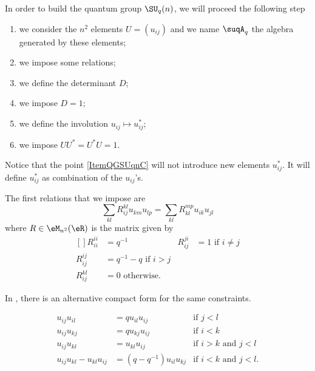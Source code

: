 In order to build the quantum group $\SU_q(n)$, we will proceed the following step\cite{Koelink}
\begin{enumerate}
    \item
        we consider the $n^2$ elements $U=(u_{ij})$ and we name $\suqA_q$ the algebra generated by these elements;
    \item
        we impose some relations;
    \item
        we define the determinant $D$;
    \item
        we impose $D=1$;
    \item\label{ItemQGSUqnC}
        we define the involution $u_{ij}\mapsto u_{ij}^*$;
    \item
        we impose $UU^*=U^*U=1$.
        
\end{enumerate}
Notice that the point \ref{ItemQGSUqnC} will not introduce new elements $u_{ij}^*$. It will define $u_{ij}^*$ as combination of the $u_{ij}$'s.

The first relations that we impose are
\begin{equation}        \label{EqRelsSUqnAvecR}
    \sum_{kl}R^{kl}_{ij}u_{km}u_{lp}=\sum_{kl}R^{mp}_{kl}u_{ik}u_{jl}
\end{equation}
where $R\in\eM_{n^2}(\eR)$ is the matrix given by
\begin{equation}
    \begin{aligned}[]
        R_{ii}^{ii}&=q^{-1}&R_{ij}^{ji}&=1\text{ if $i\neq j$}\\
        R_{ij}^{ij}&=q^{-1}-q\text{ if $i>j$}\\
        R_{ij}^{kl}&=0\text{ otherwise}.
    \end{aligned}
\end{equation}

\begin{remark}
    In \cite{Bragiel}, there is an alternative compact form for the same constraints.
\end{remark}

\begin{proposition}
    \begin{subequations}        \label{SUBEquuijcondiv}
        \begin{align}
            u_{ij}u_{il}&=qu_{il}u_{ij}&\text{if $j<l$}         \label{subEquuijcondi} \\
            u_{ij}u_{kj}&=qu_{kj}u_{ij}&\text{if $i<k$}\label{subEquuijcondii}\\
            u_{ij}u_{kl}&=u_{kl}u_{ij}&\text{if $i>k$ and $j<l$}\label{subEquuijcondiii}\\
            u_{ij}u_{kl}-u_{kl}u_{ij}&=(q-q^{-1})u_{il}u_{kj}&\text{if $i<k$ and $j<l$}\label{subEquuijcondiv}.
        \end{align}
    \end{subequations}
\end{proposition}

